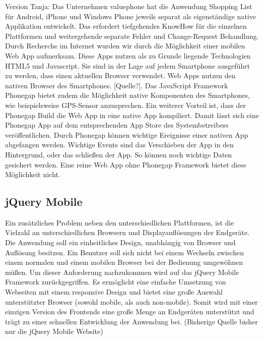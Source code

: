 \documentclass[10pt, conference, compsocconf]{IEEEtran}
\begin{document}
Version Tanja:
Das Unternehmen valuephone hat die Anwendung Shopping List f\"ur Android, iPhone und Windows Phone jeweils separat als eigenst\"andige native Applikation entwickelt. Das erfordert tiefgehendes KnowHow f\"ur die einzelnen Plattformen und weitergehende separate Fehler und Change-Request Behandlung. Durch Recherche im Internet wurden wir durch die M\"oglichkeit einer mobilen Web App aufmerksam. Diese Apps nutzen als zu Grunde liegende Technologien HTML5 und Javascript. Sie sind in der Lage auf jedem Smartphone ausgef\"uhrt zu werden, dass einen aktuellen Browser verwendet. Web Apps nutzen den nativen Browser des Smartphones. [Quelle?]. Das JavaScript Framework Phonegap bietet zudem die M\"oglichkeit native Komponenten des Smartphones, wie beispielsweise GPS-Sensor anzusprechen. Ein weiterer Vorteil ist, dass der Phonegap Build die Web App in eine native App kompiliert. Damit l\"asst sich eine Phonegap App auf dem entsprechenden App Store des Systembetreibers ver\"offentlichen. Durch Phonegap k\"onnen wichtige Ereignisse einer nativen App abgefangen werden. Wichtige Events sind das Verschieben der App in den Hintergrund, oder das schlie{\ss}en der App. So k\"onnen noch wichtige Daten gesichert werden. Eine reine Web App ohne Phonegap Framework bietet diese M\"oglichkeit nicht.

\subsection{jQuery Mobile}
Ein zus\"atzliches Problem neben den unterschiedlichen Plattformen, ist die Vielzahl an unterschiedlichen Browsern und Displayaufl\"osungen der Endger\"ate. Die Anwendung soll ein einheitliches Design, unabh\"angig von Browser und Aufl\"osung besitzen. Ein Benutzer soll sich nicht bei einem Wechseln zwischen einem normalen und einem mobilen Browser bei der Bedienung umgew\"ohnen m\"u{\ss}en. Um dieser Anforderung nachzukommen wird auf das jQuery Mobile Framework zur\"uckgegriffen. Es erm\"oglicht eine einfache Umsetzung von Webseiten mit einem responsive Design und bietet eine gro{\ss}e Auswahl unterst\"utzter Browser (sowohl mobile, als auch non-mobile). Somit wird mit einer einzigen Version des Frontends eine gro{\ss}e Menge an Endger\"aten unterst\"utzt und tr\"agt zu einer schnellen Entwicklung der Anwendung bei. (Bisherige Quelle bisher nur die jQuery Mobile Website)
\end{document}
